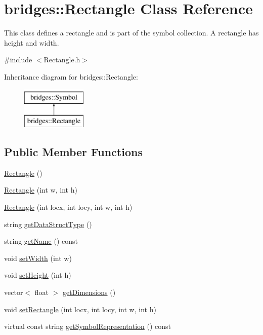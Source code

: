 \hypertarget{classbridges_1_1_rectangle}{}\section{bridges\+:\+:Rectangle Class Reference}
\label{classbridges_1_1_rectangle}


This class defines a rectangle and is part of the symbol collection. A rectangle has height and width.  




{\ttfamily \#include $<$Rectangle.\+h$>$}

Inheritance diagram for bridges\+:\+:Rectangle\+:\begin{figure}[H]
\begin{center}
\leavevmode
\includegraphics[height=2.000000cm]{classbridges_1_1_rectangle}
\end{center}
\end{figure}
\subsection*{Public Member Functions}
\begin{DoxyCompactItemize}
\item 
\hyperlink{classbridges_1_1_rectangle_a8d5b640b27372d32d7761769df343290}{Rectangle} ()
\item 
\hyperlink{classbridges_1_1_rectangle_ab5b67756e761bdd9515406874fbfb75a}{Rectangle} (int w, int h)
\item 
\hyperlink{classbridges_1_1_rectangle_a0f108bbf4b718aa2e1105383c10ab7d9}{Rectangle} (int locx, int locy, int w, int h)
\item 
string \hyperlink{classbridges_1_1_rectangle_a596586044a960de76ab95b859bf16235}{get\+Data\+Struct\+Type} ()
\item 
string \hyperlink{classbridges_1_1_rectangle_a3c533da8dd497d240106966f8fbe56a4}{get\+Name} () const 
\item 
void \hyperlink{classbridges_1_1_rectangle_ab592c45be7344b4a406d6332b392cb12}{set\+Width} (int w)
\item 
void \hyperlink{classbridges_1_1_rectangle_aa14d6619e60de1d660fa6f3770dfaaa7}{set\+Height} (int h)
\item 
vector$<$ float $>$ \hyperlink{classbridges_1_1_rectangle_a459587616a9674f6f0f02bac08589e23}{get\+Dimensions} ()
\item 
void \hyperlink{classbridges_1_1_rectangle_aee11bd9b9601d54c652b5b225c75bbac}{set\+Rectangle} (int locx, int locy, int w, int h)
\item 
virtual const string \hyperlink{classbridges_1_1_rectangle_ab80ba97fde6c8a8d88ee97055ba709bf}{get\+Symbol\+Representation} () const 
\end{DoxyCompactItemize}
